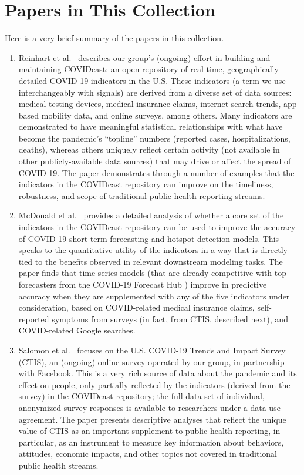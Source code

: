 \documentclass{article}
\begin{document}
\section{Papers in This Collection}

Here is a very brief summary of the papers in this collection.

\begin{enumerate}
\item Reinhart et al.\ \citep{Reinhart:2021} describes our group's (ongoing)
  effort in building and maintaining COVIDcast: an open repository of real-time,
  geographically detailed COVID-19 indicators in the U.S.  These indicators (a
  term we use interchangeably with signals) are derived from a diverse set of
  data sources: medical testing devices, medical insurance claims, internet
  search trends, app-based mobility data, and online surveys, among others.
  Many indicators are demonstrated to have meaningful statistical relationships
  with what have become the pandemic's ``topline'' numbers (reported cases,
  hospitalizations, deaths), whereas others uniquely reflect certain activity
  (not available in other publicly-available data sources) that may drive or
  affect the spread of COVID-19.  The paper demonstrates through a number of
  examples that the indicators in the COVIDcast repository can improve on the
  timeliness, robustness, and scope of traditional public health reporting streams.   

\item McDonald et al.\ \citep{McDonald:2021} provides a detailed analysis of
  whether a core set of the indicators in the COVIDcast repository can be used
  to improve the accuracy of COVID-19 short-term forecasting and hotspot
  detection models. This speaks to the quantitative utility of the indicators in
  a way that is directly tied to the benefits observed in relevant downstream
  modeling tasks. The paper finds that time series models (that are already
  competitive with top forecasters from the COVID-19 Forecast Hub
  \citep{ForecastHub}) improve in predictive accuracy when they are supplemented
  with any of the five indicators under consideration, based on COVID-related
  medical insurance claims, self-reported symptoms from surveys (in fact, from
  CTIS, described next), and COVID-related Google searches.  

\item Salomon et al.\ \citep{Salomon:2021} focuses on the U.S. COVID-19 Trends 
  and Impact Survey (CTIS), an (ongoing) online survey operated by our group, in
  partnership with Facebook.  This is a very rich source of data about the
  pandemic and its effect on people, only partially reflected by the indicators
  (derived from the survey) in the COVIDcast repository; the full data set of
  individual, anonymized survey responses is available to researchers under a
  data use agreement.  The paper presents descriptive analyses that reflect the
  unique value of CTIS as an important supplement to public health reporting, in
  particular, as an instrument to measure key information about behaviors, 
  attitudes, economic impacts, and other topics not covered in traditional
  public health streams. 


\end{enumerate}
\end{document}
